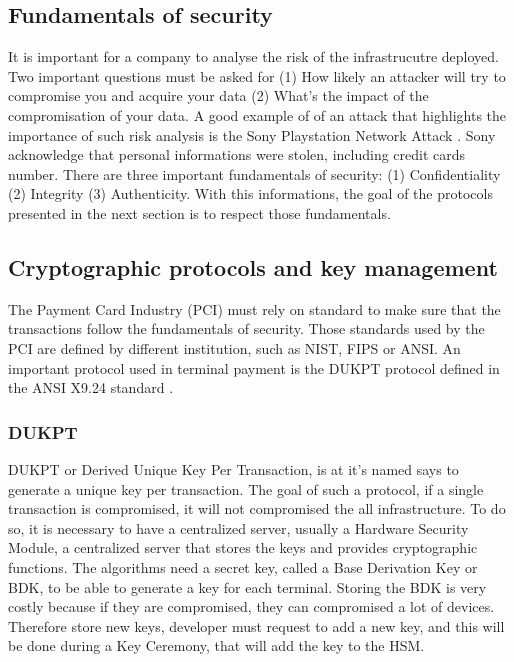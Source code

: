 \documentclass[11pt,a4paper]{article}
\begin{document}
\subsection{Fundamentals of security}

It is important for a company to analyse the risk
of the infrastrucutre deployed. Two important questions must
be asked for (1) How likely an attacker will try to compromise
you and acquire your data (2) What's the impact of the compromisation
of your data. A good example of of an attack that highlights
the importance of such risk analysis is the Sony Playstation Network
Attack \cite{raiu_cyber-threat_2012}. Sony acknowledge that
personal informations were stolen, including credit cards number.
There are three important fundamentals of security:
(1) Confidentiality (2) Integrity (3) Authenticity.
With this informations, the goal of the protocols presented
in the next section is to respect those fundamentals.

\subsection{Cryptographic protocols and key management}

The Payment Card Industry (PCI) must rely on standard to make
sure that the transactions follow the fundamentals of security.
Those standards used by the PCI are defined by different institution, such
as NIST, FIPS or ANSI. An important protocol used in terminal payment
is the DUKPT protocol defined in
the ANSI X9.24 standard \cite{ansi_x924}.

\subsubsection{DUKPT}

DUKPT or Derived Unique Key Per Transaction, is at it's named
says to generate a unique key per transaction.
The goal of such a protocol, if a single transaction is compromised,
it will not compromised the all infrastructure.
To do so, it is necessary to have a centralized server, usually
a Hardware Security Module, a centralized server that stores
the keys and provides cryptographic functions.
The algorithms need a secret key,
called a Base Derivation Key or BDK, to be able to generate
a key for each terminal. Storing the BDK is very costly because
if they are compromised, they can compromised a lot of devices.
Therefore store new keys, developer must request to add a new
key, and this will be done during a Key Ceremony, that will
add the key to the HSM.
\end{document}
